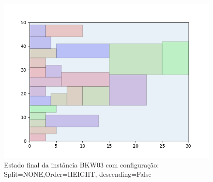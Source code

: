 \begin{figure}[H]
    \centering
    \caption[]{Estado final da instância BKW03 com configuração: Split=NONE,Order=HEIGHT, descending=False}
    \label{fig:bkw03-none-height-false}
    \includegraphics[scale=0.5]{output/figures/bkw/bkw03/none/height/false/00}
\end{figure}